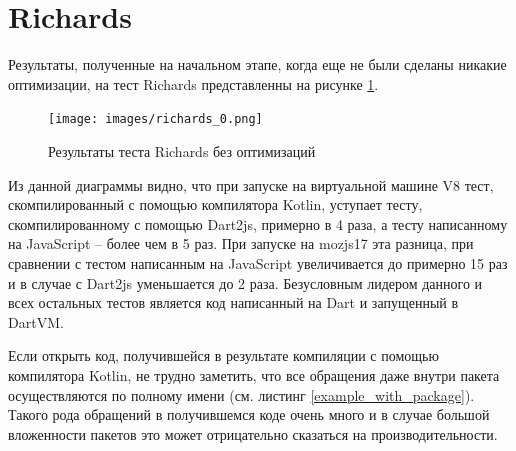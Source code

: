 \section{Richards}

Результаты, полученные на начальном этапе, когда еще не были сделаны никакие оптимизации, на тест Richards представленны на рисунке \ref{richards_0}.

\begin{figure}[ht!]
\centering
\texttt{[image: images/richards\_0.png]}
\caption{Результаты теста Richards без оптимизаций}
\label{richards_0}
\end{figure}

Из данной диаграммы видно, что при запуске на виртуальной машине V8 тест, скомпилированный с помощью компилятора Kotlin, уступает тесту, скомпилированному с помощью Dart2js, примерно в 4 раза, а тесту написанному на JavaScript -- более чем в 5 раз. При запуске на mozjs17 эта разница, при сравнении с тестом написанным на JavaScript увеличивается до примерно 15 раз и в случае с Dart2js уменьшается до 2 раза. Безусловным лидером данного и всех остальных тестов является код написанный на Dart и запущенный в DartVM.

Если открыть код, получившейся в результате компиляции с помощью компилятора Kotlin, не трудно заметить, что все обращения даже внутри пакета осуществляются по полному имени (см. листинг \ref{example_with_package}). Такого рода обращений в получившемся коде очень много и в случае большой вложенности пакетов это может отрицательно сказаться на производительности. 

\begin{code}
\begin{JavaScript}[caption=Пример код с обращением по полному имени внутри того же пакета, label=example_with_package]
...
_ = {
org: Kotlin.definePackage({
  jetbrains: Kotlin.definePackage({
    kotlin: Kotlin.definePackage({
      benchmarks: Kotlin.definePackage({
        Richards_from_darts: Kotlin.definePackage({
          js: Kotlin.definePackage({
            //...
            addIdleTask: function (id, priority, queue, count) {
            this.addRunningTask(id, priority, queue, new _.org.jetbrains.kotlin.benchmarks.Richards.js.IdleTask(this, 1, count));
            }
            //...
\end{JavaScript}
\end{code}

